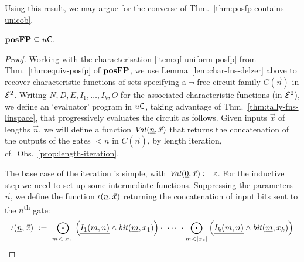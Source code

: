 \documentclass{lmcs}
\begin{document}
\noindent
Using this result, we may argue for the converse of Thm.~\ref{thm:posfp-contains-unicob}.
\begin{theorem}
	\label{thm:unicob-contains-posfp}
	$\mathbf{pos}\mathbf{FP} \subseteq u \mathsf{C}$.
\end{theorem}



\begin{proof}
	Working with the characterisation \eqref{item:qf-uniform-posfp} from Thm.~\ref{thm:equiv-posfp} of $\mathbf{pos}\mathbf{FP}$, we use Lemma~\ref{lem:char-fns-delzer} above to recover characteristic functions of sets specifying a $\neg$-free circuit family $C(\vec n)$ in $\mathcal{E}^2$.
	Writing $N, D, E, I_1 , \dots , I_k, O$ for the associated characteristic functions (in $\mathcal{E}^2$), we define an `evaluator' program in $u \mathsf{C}$, taking advantage of Thm.~\ref{thm:tally-fns-linspace}, that progressively evaluates the circuit as follows.
	Given inputs $\vec x$ of lengths $\vec n$, we will define a function $\mathit{Val}(\underline{n} , \vec x)$ that returns the concatenation of the outputs of the gates $< n$ in $C(\vec n)$, by length iteration, cf.~Obs.~\ref{prop:length-iteration}.
	
	The base case of the iteration is simple, with $\mathit{Val}(\underline{0} , \vec x) := \varepsilon$.
	For the inductive step we need to set up some intermediate functions.
	Suppressing the parameters $\vec n$, we
	define the function $\iota (\underline{n} , \vec x)$ returning the concatenation of input bits sent to the $n$\textsuperscript{th} gate: 
	\[
	\iota (\unary n , \vec x)
	\ \dfn \ 
		\concat\limits_{m<|x_1|} \left(\unary{I_1 ( m, n)} \wedge \bit (\unary m , x_1) \right)
	\cdot \  \cdots \ \cdot
		\concat\limits_{m<|x_k|} \left(\unary{I_k (m,n)} \wedge \bit (\unary m , x_k) \right)
	\]
	
	

\end{proof}
\end{document}
